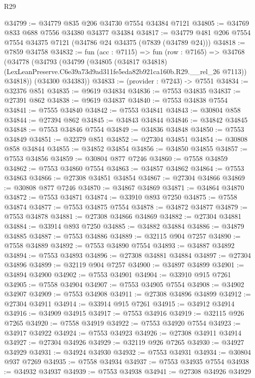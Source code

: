 \begin{lexlean}{R29}
\begin{coremodule}
@34799 := @34779 @835 @206 @34730 @7554 @34384 @7121
@34805 := @34769 @833 @688 @7556 @34380 @34377 @34384
@34817 := @34779 @481 @206 @7554 @7554 @34375 @7121 (@34786 @24 @34375 (@7839 (@34789 @24)))
@34818 := @7859 @34758
@34832 := fun (acc : @7115) =>
  fun (row : @7165) =>
  @34768
    (@34778
      (@34793
        (@34799
          (@34805
            (@34817 @34818)
            (LexLeanPreserve.C6e39a73d9ad311fe5eda82b921ca160b.R29.__rel_26 @7113))
          @34818))
      (@34300 @34383))
@34833 := (provider : @7243) -> @7551
@34834 := @32376 @851
@34835 := @9619 @34834
@34836 := @7553 @34835
@34837 := @27391 @862
@34838 := @9619 @34837
@34840 := @7553 @34838 @7554
@34841 := @7555 @34840
@34842 := @7553 @34841
@34843 := @30804 @858
@34844 := @27394 @862
@34845 := @34843 @34844
@34846 := @34842 @34845
@34848 := @7553 @34846 @7554
@34849 := @34836 @34848
@34850 := @7553 @34849
@34851 := @32379 @851
@34852 := @27304 @34851
@34854 := @30808 @858 @34844
@34855 := @34852 @34854
@34856 := @34850 @34855
@34857 := @7553 @34856
@34859 := @30804 @877 @7246
@34860 := @7558 @34859
@34862 := @7553 @34860 @7554
@34863 := @34857 @34862
@34864 := @7553 @34863
@34866 := @27308 @34851 @34854
@34867 := @27304 @34866
@34869 := @30808 @877 @7246
@34870 := @34867 @34869
@34871 := @34864 @34870
@34872 := @7553 @34871
@34874 := @33910 @893 @7250
@34875 := @7558 @34874
@34877 := @7553 @34875 @7554
@34878 := @34872 @34877
@34879 := @7553 @34878
@34881 := @27308 @34866 @34869
@34882 := @27304 @34881
@34884 := @33914 @893 @7250
@34885 := @34882 @34884
@34886 := @34879 @34885
@34887 := @7553 @34886
@34889 := @32115 @904 @7257
@34890 := @7558 @34889
@34892 := @7553 @34890 @7554
@34893 := @34887 @34892
@34894 := @7553 @34893
@34896 := @27308 @34881 @34884
@34897 := @27304 @34896
@34899 := @32119 @904 @7257
@34900 := @34897 @34899
@34901 := @34894 @34900
@34902 := @7553 @34901
@34904 := @33910 @915 @7261
@34905 := @7558 @34904
@34907 := @7553 @34905 @7554
@34908 := @34902 @34907
@34909 := @7553 @34908
@34911 := @27308 @34896 @34899
@34912 := @27304 @34911
@34914 := @33914 @915 @7261
@34915 := @34912 @34914
@34916 := @34909 @34915
@34917 := @7553 @34916
@34919 := @32115 @926 @7265
@34920 := @7558 @34919
@34922 := @7553 @34920 @7554
@34923 := @34917 @34922
@34924 := @7553 @34923
@34926 := @27308 @34911 @34914
@34927 := @27304 @34926
@34929 := @32119 @926 @7265
@34930 := @34927 @34929
@34931 := @34924 @34930
@34932 := @7553 @34931
@34934 := @30804 @937 @7269
@34935 := @7558 @34934
@34937 := @7553 @34935 @7554
@34938 := @34932 @34937
@34939 := @7553 @34938
@34941 := @27308 @34926 @34929

\end{coremodule}
\end{lexlean}
